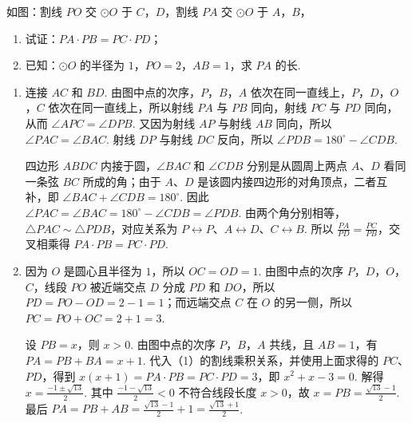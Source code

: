 \begin{problem}
如图：割线 \(PO\) 交 \(\odot O\) 于 \(C\)，\(D\)，割线 \(PA\) 交 \(\odot O\) 于 \(A\)，\(B\)，

\begin{enumerate}
    \item 试证：\(PA\cdot PB=PC\cdot PD\)；
    \item 已知：\(\odot O\) 的半径为 \(1\)，\(PO=2\)，\(AB=1\)，求 \(PA\) 的长.
\end{enumerate}

\end{problem}

\begin{solution}
\begin{enumerate}
\item 连接 \(AC\) 和 \(BD\). 由图中点的次序，\(P\)，\(B\)，\(A\) 依次在同一直线上，\(P\)，\(D\)，\(O\)，\(C\) 依次在同一直线上，所以射线 \(PA\) 与 \(PB\) 同向，射线 \(PC\) 与 \(PD\) 同向，从而 \(\angle APC=\angle DPB\). 又因为射线 \(AP\) 与射线 \(AB\) 同向，所以 \(\angle PAC=\angle BAC\). 射线 \(DP\) 与射线 \(DC\) 反向，所以 \(\angle PDB=180^\circ-\angle CDB\).

四边形 \(ABDC\) 内接于圆，\(\angle BAC\) 和 \(\angle CDB\) 分别是从圆周上两点 \(A\)、\(D\) 看同一条弦 \(BC\) 所成的角；由于 \(A\)、\(D\) 是该圆内接四边形的对角顶点，二者互补，即 \(\angle BAC+\angle CDB=180^\circ\). 因此 \(\angle PAC=\angle BAC=180^\circ-\angle CDB=\angle PDB\). 由两个角分别相等，\(\triangle PAC\sim\triangle PDB\)，对应关系为 \(P\leftrightarrow P\)、\(A\leftrightarrow D\)、\(C\leftrightarrow B\). 所以
\(\frac{PA}{PD}=\frac{PC}{PB}\)，交叉相乘得 \(PA\cdot PB=PC\cdot PD\).

\item 因为 \(O\) 是圆心且半径为 \(1\)，所以 \(OC=OD=1\). 由图中点的次序 \(P\)，\(D\)，\(O\)，\(C\)，线段 \(PO\) 被近端交点 \(D\) 分成 \(PD\) 和 \(DO\)，所以 \(PD=PO-OD=2-1=1\)；而远端交点 \(C\) 在 \(O\) 的另一侧，所以 \(PC=PO+OC=2+1=3\).

设 \(PB=x\)，则 \(x>0\). 由图中点的次序 \(P\)，\(B\)，\(A\) 共线，且 \(AB=1\)，有 \(PA=PB+BA=x+1\). 代入（1）的割线乘积关系，并使用上面求得的 \(PC\)、\(PD\)，得到
\(x(x+1)=PA\cdot PB=PC\cdot PD=3\)，即 \(x^2+x-3=0\). 解得 \(x=\frac{-1\pm\sqrt{13}}{2}\). 其中 \(\frac{-1-\sqrt{13}}{2}<0\) 不符合线段长度 \(x>0\)，故 \(x=PB=\frac{\sqrt{13}-1}{2}\). 最后
\(PA=PB+AB=\frac{\sqrt{13}-1}{2}+1=\frac{\sqrt{13}+1}{2}\).
\end{enumerate}
\end{solution}

